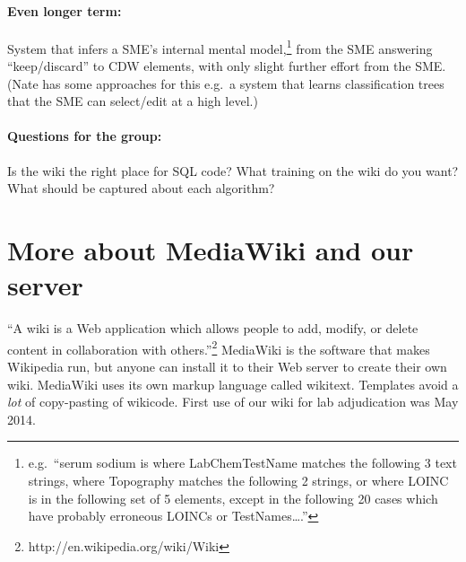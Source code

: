 \documentclass{tufte-handout}
\begin{document}
\paragraph{Even longer term:} System that infers a SME's internal mental
model,\footnote{e.g.\ ``serum sodium is where LabChemTestName matches
  the following 3 text strings, where Topography matches the following
  2 strings, or where LOINC is in the following set of 5 elements,
  except in the following 20 cases which have probably erroneous
  LOINCs or TestNames\ldots{}.''} from the SME answering
``keep/discard'' to CDW elements, with only slight further effort from
the SME. (Nate has some approaches for this e.g.\ a system that learns
classification trees that the SME can select/edit at a high level.)

\paragraph{Questions for the group:} Is the wiki the right place for
SQL code? What training on the wiki do you want? What should be
captured about each algorithm?

\section{More about MediaWiki and our server}

``A wiki is a Web application which allows people to add, modify, or
delete content in collaboration with
others.''\footnote{http://en.wikipedia.org/wiki/Wiki} MediaWiki is the
software that makes Wikipedia run, but anyone can install it to their
Web server to create their own wiki. MediaWiki uses its own markup
language called wikitext. Templates avoid a \emph{lot} of copy-pasting
of wikicode. First use of our wiki for lab adjudication was May 2014.
\end{document}
